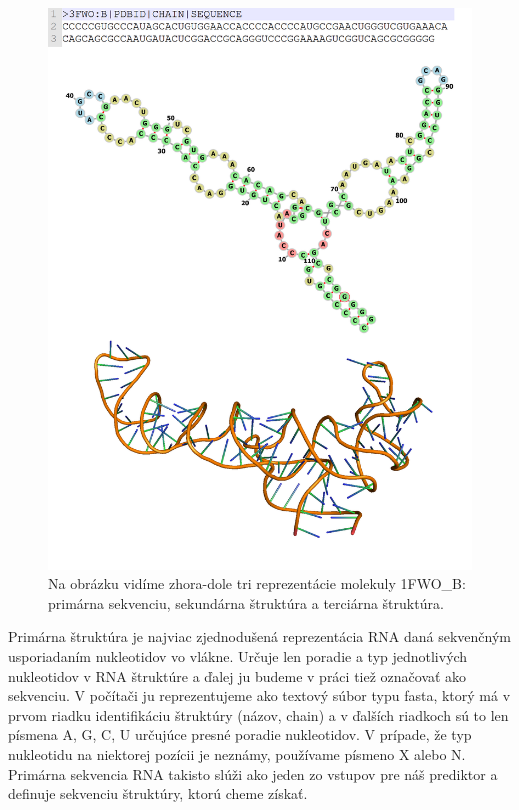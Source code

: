 \begin{figure}%
\includegraphics[width=\textwidth]{../img/combStructures}
\caption{Na obrázku vidíme zhora-dole tri reprezentácie molekuly 1FWO\_B: primárna sekvenciu, sekundárna štruktúra a terciárna štruktúra.}
\label{obr0:structures}
\end{figure}

\indent Primárna štruktúra je najviac zjednodušená reprezentácia RNA daná sekvenčným usporiadaním nukleotidov vo vlákne. Určuje len poradie a typ jednotlivých nukleotidov v RNA štruktúre a ďalej ju budeme v práci tiež označovať ako sekvenciu. V počítači ju reprezentujeme ako textový súbor typu fasta, ktorý má v prvom riadku identifikáciu štruktúry (názov, chain) a v ďalších riadkoch sú to len písmena A, G, C, U určujúce presné poradie nukleotidov. V prípade, že typ nukleotidu na niektorej pozícii je neznámy, používame písmeno X alebo N. Primárna sekvencia RNA takisto slúži ako jeden zo vstupov pre náš prediktor a definuje sekvenciu štruktúry, ktorú cheme získať.


